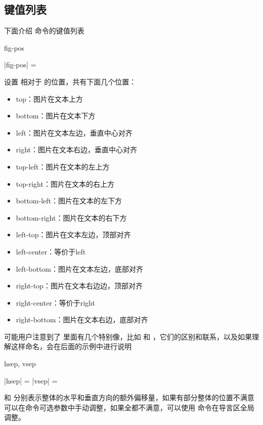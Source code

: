 \documentclass{l3doc}
\begin{document}
\subsection{键值列表}
下面介绍  命令的键值列表
\begin{function}[added = 2022-01-22, updated = 2022-01-22]{fig-pos}
  \begin{syntax}
    |fig-pos| =  
  \end{syntax}
  设置  相对于 的位置，共有下面几个位置：
    \begin{itemize}
      \item top：图片在文本上方
      \item bottom：图片在文本下方
      \item left：图片在文本左边，垂直中心对齐
      \item right：图片在文本右边，垂直中心对齐
      \item top-left：图片在文本的左上方
      \item top-right：图片在文本的右上方
      \item bottom-left：图片在文本的左下方
      \item bottom-right：图片在文本的右下方
      \item left-top：图片在文本左边，顶部对齐
      \item left-center：等价于left
      \item left-bottom：图片在文本左边，底部对齐
      \item right-top：图片在文本右边边，顶部对齐
      \item right-center：等价于right
      \item right-bottom：图片在文本右边，底部对齐
    \end{itemize}
  可能用户注意到了  里面有几个特别像，比如  和 ，它们的区别和联系，以及如果理解这样命名，会在后面的示例中进行说明
\end{function}


\begin{function}[added = 2022-01-22, updated = 2022-01-23]{hsep, vsep}
  \begin{syntax}
    |hsep| =  \init{0pt}
    |vsep| =  \init{0pt}
  \end{syntax}
   和  分别表示整体的水平和垂直方向的额外偏移量，如果有部分整体的位置不满意可以在命令可选参数中手动调整，如果全都不满意，可以使用  命令在导言区全局调整。
\end{function}
\end{document}
